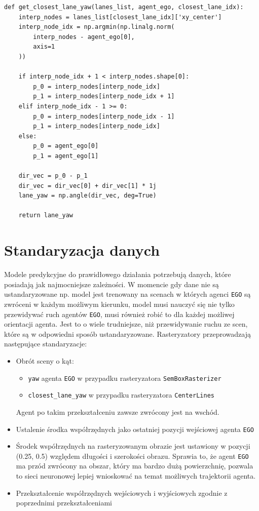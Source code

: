 \begin{verbatim}
def get_closest_lane_yaw(lanes_list, agent_ego, closest_lane_idx):
    interp_nodes = lanes_list[closest_lane_idx]['xy_center']
    interp_node_idx = np.argmin(np.linalg.norm(
        interp_nodes - agent_ego[0],
        axis=1
    ))

    if interp_node_idx + 1 < interp_nodes.shape[0]:
        p_0 = interp_nodes[interp_node_idx]
        p_1 = interp_nodes[interp_node_idx + 1]
    elif interp_node_idx - 1 >= 0:
        p_0 = interp_nodes[interp_node_idx - 1]
        p_1 = interp_nodes[interp_node_idx]
    else:
        p_0 = agent_ego[0]
        p_1 = agent_ego[1]

    dir_vec = p_0 - p_1
    dir_vec = dir_vec[0] + dir_vec[1] * 1j
    lane_yaw = np.angle(dir_vec, deg=True)

    return lane_yaw
\end{verbatim}

\newpage

\section{Standaryzacja danych}

Modele predykcyjne do prawidłowego działania potrzebują danych, które posiadają jak najmocniejsze zależności. W momencie gdy dane nie są ustandaryzowane np. model jest trenowany na scenach w których agenci \texttt{EGO} są zwróceni w każdym możliwym kierunku, model musi nauczyć się nie tylko przewidywać ruch agentów \texttt{EGO}, musi również robić to dla każdej możliwej orientacji agenta. Jest to o wiele trudniejsze, niż przewidywanie ruchu ze scen, które są w odpowiedni sposób ustandaryzowane. Rasteryzatory przeprowadzają następujące standaryzacje:

\begin{itemize}
    \setlength{\itemsep}{1pt}
    \setlength{\parskip}{0pt}
    \setlength{\parsep}{0pt}
    \item Obrót sceny o kąt:
    \begin{itemize}
    \item \texttt{yaw} agenta \texttt{EGO} w przypadku rasteryzatora \texttt{SemBoxRasterizer}
    \item \texttt{closest\_lane\_yaw} w przypadku rasteryzatora \texttt{CenterLines}
    \end{itemize}
    Agent po takim przekształceniu zawsze zwrócony jest na wschód.
    \item Ustalenie środka współrzędnych jako ostatniej pozycji wejściowej agenta \texttt{EGO}
    \item Środek współrzędnych na rasteryzowanym obrazie jest ustawiony w pozycji (0.25, 0.5) względem długości i szerokości obrazu. Sprawia to, że agent \texttt{EGO} ma przód zwrócony na obszar, który ma bardzo dużą powierzchnię, pozwala to sieci neuronowej lepiej wnioskować na temat możliwych trajektorii agenta.
    \item Przekształcenie współrzędnych wejściowych i wyjściowych zgodnie z poprzednimi przekształceniami
\end{itemize}

